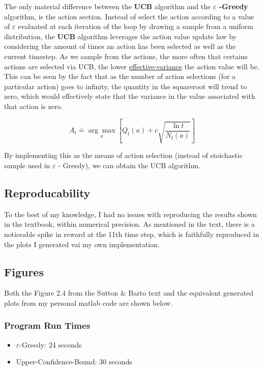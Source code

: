 \documentclass[12pt]{article}
\begin{document}
The only material difference between the \textbf{UCB} algorithm and the \textbf{$\varepsilon $ -Greedy} algorithm, is the action section. Instead of select the action according to a value of $ \varepsilon$ evaluated at each iteration of the loop by drawing a sample from a uniform distribution, the \textbf{UCB} algorithm leverages the action value update law by considering the amount of times an action has been selected as well as the current timestep. As we sample from the actions, the more often that certains actions are selected via UCB, the lower \underline{effective-variance} the action value will be. This can be seen by the fact that as the number of action selections (for a particular action) goes to infinity, the quantity in the squareroot will trend to zero, which would effectively state that the variance in the value associated with that action is zero.


$$
A_{t} \doteq \underset{a}{\arg \max }\left[Q_{t}(a)+c \sqrt{\frac{\ln t}{N_{t}(a)}}\right]
$$

By implementing this as the means of action selection (instead of stoichastic sample used in $\varepsilon$ - Greedy), we can obtain the UCB algorithm.

\subsection*{Reproducability}

To the best of my knowledge, I had no issues with reproducing the results shown in the textbook, within numerical precision. As mentioned in the text, there is a noticeable spike in reward at the 11th time step, which is faithfully reproduced in the plots I generated vai my own implementation.


\subsection*{Figures}

Both the Figure 2.4 from the Sutton \& Barto text and the equivalent generated plots from my personal matlab code are shown below.

\subsubsection*{Program Run Times}

\begin{itemize}
    \item $\varepsilon$-Greedy: 24 seconds
    \item Upper-Confidence-Bound: 30 seconds
\end{itemize}
\end{document}
